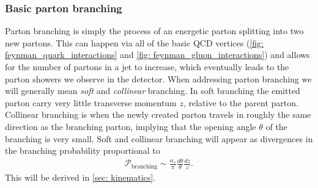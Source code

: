\documentclass[main.tex]{subfiles}
\begin{document}
\subsubsection*{Basic parton branching}
Parton branching is simply the process of an energetic parton splitting into two new partons. This can happen via all of the basic QCD vertices (\autoref{fig: feynman_quark_interactions} and \autoref{fig: feynman_gluon_interactions}) and allows for the number of partons in a jet to increase, which eventually leads to the parton showers we observe in the detector. When addressing parton branching we will generally mean \emph{soft} and \emph{collinear} branching. In soft branching the emitted parton carry very little transverse momentum \(z\), relative to the parent parton. Collinear branching is when the newly created parton travels in roughly the same direction as the branching parton, implying that the opening angle \(\theta\) of the branching is very small. Soft and collinear branching will appear as divergences in the branching probability proportional to
\begin{align}
    \mathcal{P}_{\text{branching}} \sim \frac{\alpha_s}{\pi} \frac{d\theta}{\theta} \frac{dz}{z}.
\end{align}
This will be derived in \autoref{sec: kinematics}.
\end{document}
